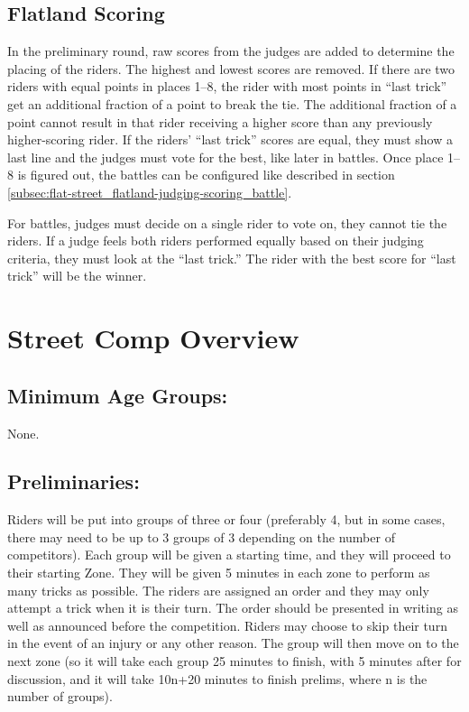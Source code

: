 \subsection{Flatland Scoring}
In the preliminary round, raw scores from the judges are added to determine the placing of the riders.
The highest and lowest scores are removed.
If there are two riders with equal points in places 1–8, the rider with most points in ``last trick'' get an additional fraction of a point to break the tie.
The additional fraction of a point cannot result in that rider receiving a higher score than any previously higher-scoring rider.
If the riders' ``last trick'' scores are equal, they must show a last line and the judges must vote for the best, like later in battles.
Once place 1–8 is figured out, the battles can be configured like described in section \ref{subsec:flat-street_flatland-judging-scoring_battle}.

For battles, judges must decide on a single rider to vote on, they cannot tie the riders.
If a judge feels both riders performed equally based on their judging criteria, they must look at the ``last trick.''
The rider with the best score for ``last trick'' will be the winner.
 
\section{Street Comp Overview}

\subsection{Minimum Age Groups:}
None.

\subsection{Preliminaries:}
Riders will be put into groups of three or four (preferably 4, but in some cases, there may need to be up to 3 groups of 3 depending on the number of competitors).
Each group will be given a starting time, and they will proceed to their starting Zone.
They will be given 5 minutes in each zone to perform as many tricks as possible.
The riders are assigned an order and they may only attempt a trick when it is their turn.
The order should be presented in writing as well as announced before the competition.
Riders may choose to skip their turn in the event of an injury or any other reason.
The group will then move on to the next zone (so it will take each group 25 minutes to finish, with 5 minutes after for discussion, and it will take 10n+20 minutes to finish prelims, where n is the number of groups).

